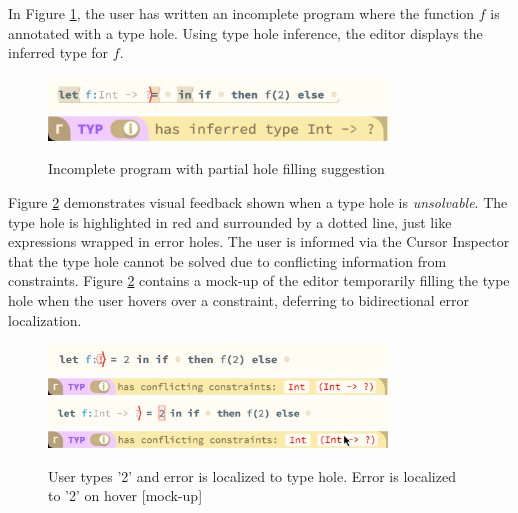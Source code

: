 In Figure \ref{fig:editor_holes}, the user has written an incomplete program where the function $f$ is annotated with a type hole. Using type hole inference, the editor displays the inferred type for $f$.
\begin{figure}[H]
\includegraphics[width=9cm]{images/example_holes.png}
\includegraphics[width=9cm]{images/example_holes_CI.png}
\caption{Incomplete program with partial hole filling suggestion}
\label{fig:editor_holes}
\end{figure}
Figure \ref{fig:editor_conflict} demonstrates visual feedback shown when a type hole is \textit{unsolvable}. The type hole is highlighted in red and surrounded by a dotted line, just like expressions wrapped in error holes. The user is informed via the Cursor Inspector that the type hole cannot be solved due to conflicting information from constraints. Figure \ref{fig:editor_conflict} contains a mock-up of the editor temporarily filling the type hole when the user hovers over a constraint, deferring to bidirectional error localization.
\begin{figure}[H]
\includegraphics[width=9cm]{images/example_conflict.png}
\includegraphics[width=9cm]{images/example_conflict_CI.png}
\includegraphics[width=9cm]{images/example_conflict_hover.png}
\includegraphics[width=9cm]{images/example_conflict_hover_CI.png}
\caption{User types '2' and error is localized to type hole. Error is localized to '2' on hover [mock-up]}
\label{fig:editor_conflict}
\end{figure}
